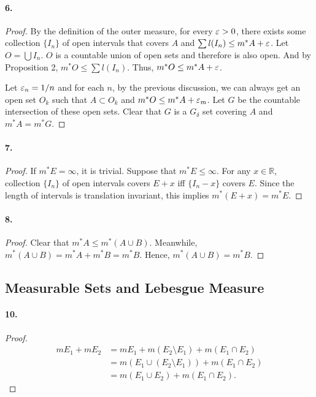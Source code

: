   \paragraph{6.}
  \begin{proof}
    By the definition of the outer measure, for every $\varepsilon > 0$, there exists 
    some collection $\{I_n\}$ of open intervals that covers $A$ and $\sum l(I_n)
    \le m^*A+\varepsilon$. Let $O=\bigcup I_n$. $O$ is a countable union of open sets 
    and therefore is also open. And by Proposition 2, $m^*O\le \sum l(I_n)$. 
    Thus, $m^*O\le m^*A+\varepsilon$. \par
    Let $\varepsilon_n = 1/n$ and for each $n$, by the previous discussion, we can 
    always get an open set $O_k$ such that $A\subset O_k$ and $m^*O\le m^*A+
    \varepsilon_m$. Let $G$ be the countable intersection of these open sets. Clear 
    that $G$ is a $G_\delta$ set covering $A$ and $m^*A=m^*G$.
  \end{proof}

  \paragraph{7.}
  \begin{proof}
    If $m^*E=\infty$, it is trivial. Suppose that $m^*E\le\infty$. For any $x\in
    \mathbb{R}$, collection $\{I_n\}$ of open intervals covers $E+x$ iff $\{I_n
    -x\}$ covers $E$. Since the length of intervals is translation invariant, 
    this implies $m^*(E+x)=m^*E$.
  \end{proof}

  \paragraph{8.}
  \begin{proof}
    Clear that $m^*A\le m^*(A\cup B)$. Meanwhile, $m^*(A\cup B) = m^*A + m^*B =
    m^*B$. Hence, $m^*(A\cup B)=m^*B$.
  \end{proof}

\subsection{Measurable Sets and Lebesgue Measure}
  \paragraph{10.}
  \begin{proof}
    \begin{align*}
      mE_1+mE_2 
      &= mE_1 + m(E_2\setminus E_1) + m(E_1\cap E_2) \\
      &= m(E_1\cup(E_2\setminus E_1)) + m(E_1\cap E_2) \\
      &= m(E_1\cup E_2) + m(E_1\cap E_2).
    \end{align*}
  \end{proof}
    
